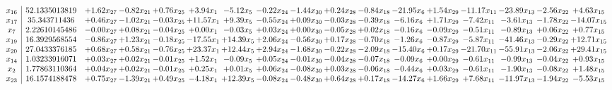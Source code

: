 \documentclass[9pt]{article}
\begin{document}
 \[\begin{array}{c| c c@{\hskip 2pt} c@{\hskip 2pt} c@{\hskip 2pt} c@{\hskip 2pt} c@{\hskip 2pt} c@{\hskip 2pt} c@{\hskip 2pt} c@{\hskip 2pt} c@{\hskip 2pt} c@{\hskip 2pt} c@{\hskip 2pt} c@{\hskip 2pt} c@{\hskip 2pt} c@{\hskip 2pt} c@{\hskip 2pt} }
 x_{16}   &  52.1335013819 & +  1.62 x_{27} & -0.82 x_{21} & +  0.76 x_{25} & +  3.94 x_{1} & -5.12 x_{5} & -0.22 x_{24} & -1.44 x_{30} & +  0.24 x_{28} & -0.84 x_{18} & -21.95 x_{6} & +  1.54 x_{29} & -11.17 x_{11} & -23.89 x_{13} & -2.56 x_{22} & +  4.63 x_{15}\\
 x_{17}   &  35.343711436 & +  0.46 x_{27} & -1.02 x_{21} & -0.03 x_{25} & + 11.57 x_{1} & +  9.39 x_{5} & -0.55 x_{24} & +  0.09 x_{30} & -0.03 x_{28} & -0.39 x_{18} & -6.16 x_{6} & +  1.71 x_{29} & -7.42 x_{11} & -3.61 x_{13} & -1.78 x_{22} & -14.07 x_{15}\\
 x_{7}   &  2.22610145486 & -0.00 x_{27} & +  0.08 x_{21} & -0.04 x_{25} & +  0.00 x_{1} & -0.03 x_{5} & +  0.03 x_{24} & +  0.00 x_{30} & -0.05 x_{28} & +  0.02 x_{18} & -0.16 x_{6} & -0.09 x_{29} & -0.51 x_{11} & -0.89 x_{13} & +  0.06 x_{22} & +  0.77 x_{15}\\
 x_{19}   &  16.3929568554 & -0.86 x_{27} & +  1.23 x_{21} & -0.18 x_{25} & -17.55 x_{1} & + 14.39 x_{5} & +  2.06 x_{24} & -0.56 x_{30} & +  0.17 x_{28} & -0.70 x_{18} & -1.26 x_{6} & -0.87 x_{29} & -5.87 x_{11} & -41.46 x_{13} & -0.29 x_{22} & + 12.71 x_{15}\\
 x_{20}   &  27.0433376185 & +  0.68 x_{27} & +  0.58 x_{21} & -0.76 x_{25} & + 23.37 x_{1} & + 12.44 x_{5} & +  2.94 x_{24} & -1.68 x_{30} & -0.22 x_{28} & -2.09 x_{18} & -15.40 x_{6} & +  0.17 x_{29} & -21.70 x_{11} & -55.91 x_{13} & -2.06 x_{22} & + 29.41 x_{15}\\
 x_{14}   &  1.03233916071 & +  0.03 x_{27} & +  0.02 x_{21} & -0.01 x_{25} & +  1.52 x_{1} & -0.09 x_{5} & +  0.05 x_{24} & -0.01 x_{30} & -0.04 x_{28} & -0.07 x_{18} & -0.09 x_{6} & +  0.00 x_{29} & -0.61 x_{11} & -0.99 x_{13} & -0.04 x_{22} & +  0.93 x_{15}\\
 x_{2}   &  1.77863110364 & +  0.04 x_{27} & +  0.02 x_{21} & -0.01 x_{25} & +  0.25 x_{1} & +  0.01 x_{5} & +  0.06 x_{24} & -0.08 x_{30} & +  0.03 x_{28} & -0.06 x_{18} & -0.44 x_{6} & +  0.03 x_{29} & -0.61 x_{11} & -1.90 x_{13} & -0.08 x_{22} & +  1.48 x_{15}\\
 x_{23}   &  16.1574188478 & +  0.75 x_{27} & -1.39 x_{21} & +  0.49 x_{25} & -4.18 x_{1} & + 12.39 x_{5} & -0.08 x_{24} & -0.48 x_{30} & +  0.64 x_{28} & +  0.17 x_{18} & -14.27 x_{6} & +  1.66 x_{29} & +  7.68 x_{11} & -11.97 x_{13} & -1.94 x_{22} & -5.53 x_{15}\\

\end{array}\]
\end{document}
